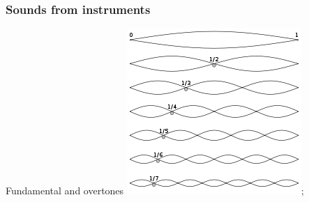 \documentclass{beamer}
\begin{document}
\begin{frame}
\frametitle{Sounds from instruments}

\begin{block}{Fundamental and overtones}
\center \includegraphics[scale = 0.75]{Harmonics.png};
\end{block}

\end{frame}
\end{document}

